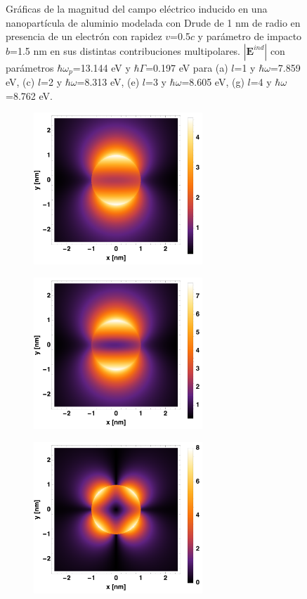 \documentclass[a4paper,10pt]{article}
\begin{document}
\begin{figure}[htb!]
\begin{subfigure}[c]{0.5\textwidth}
\caption{}
\end{subfigure}
\caption{Gráficas de la magnitud del campo eléctrico inducido en una nanopartícula de aluminio modelada con Drude de 1 nm de radio en presencia de un electrón con rapidez $v$=0.5$c$ y parámetro de impacto $b$=1.5 nm en sus distintas contribuciones multipolares. $|\textbf{E}^{ind}|$ con parámetros $\hbar\omega_p$=13.144 eV y $\hbar\Gamma$=0.197 eV para (a) $l$=1 y $\hbar\omega$=7.859 eV, (c) $l$=2 y $\hbar\omega$=8.313 eV, (e) $l$=3 y $\hbar\omega$=8.605 eV, (g) $l$=4 y $\hbar\omega$=8.762 eV.} 
\end{figure}

\begin{figure}[htb!]
\begin{subfigure}[b]{0.5\textwidth}
\includegraphics[width=180pt]{MH1.pdf}
\caption{}
\end{subfigure}
\begin{subfigure}[b]{0.5\textwidth}
\includegraphics[width=180pt]{MH1(Mar).pdf}
\caption{}
\end{subfigure}
\begin{subfigure}[b]{0.5\textwidth}
\includegraphics[width=180pt]{MH2.pdf}

\end{subfigure}
\end{figure}
\end{document}
